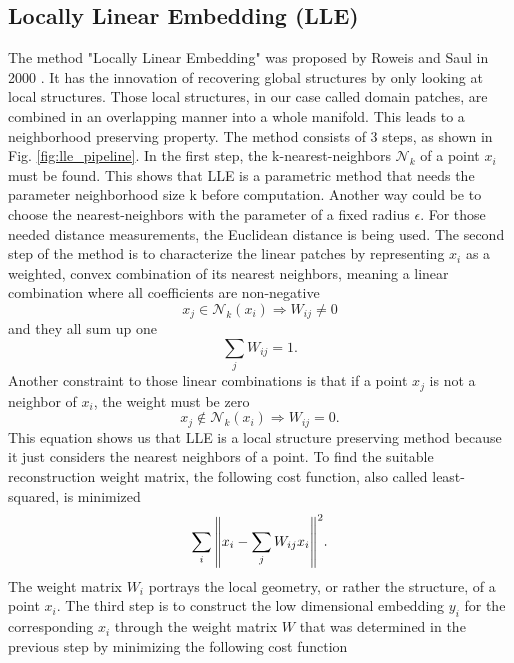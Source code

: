 \subsection{Locally Linear Embedding (LLE)}

The method "Locally Linear Embedding" was proposed by Roweis and Saul in 2000 \cite{saul00}. It has the innovation of recovering global structures by only looking at local structures. Those local structures, in our case called domain patches, are combined in an overlapping manner into a whole manifold. This leads to a neighborhood preserving property. The method consists of 3 steps, as shown in Fig. \ref{fig:lle_pipeline}. In the first step, the k-nearest-neighbors $\mathcal{N}_k$ of a point $x_i$ must be found. This shows that LLE is a parametric method that needs the parameter neighborhood size k before computation. Another way could be to choose the nearest-neighbors with the parameter of a fixed radius $\epsilon$. For those needed distance measurements, the Euclidean distance is being used. The second step of the method is to characterize the linear patches by representing $x_i$ as a weighted, convex combination of its nearest neighbors, meaning a linear combination where all coefficients are non-negative
\begin{equation}
    x_j \in \mathcal{N}_k(x_i) \Rightarrow W_{ij} \neq 0
\end{equation}
and they all sum up one 
\begin{equation}
    \sum_j W_{ij}=1.
\end{equation}
Another constraint to those linear combinations is that if a point $x_j$ is not a neighbor of $x_i$, the weight must be zero
\begin{equation}
    x_j \notin \mathcal{N}_k(x_i) \Rightarrow W_{ij}=0.
\end{equation}
This equation shows us that LLE is a local structure preserving method because it just considers the nearest neighbors of a point. To find the suitable reconstruction weight matrix, the following cost function, also called least-squared, is minimized
\begin{equation}
    \sum_i \norm{x_i - \sum_j W_{ij}x_i}^2.
\end{equation}
The weight matrix $W_i$ portrays the local geometry, or rather the structure, of a point $x_i$.
The third step is to construct the low dimensional embedding $y_i$ for the corresponding $x_i$ through the weight matrix $W$ that was determined in the previous step by minimizing the following cost function
